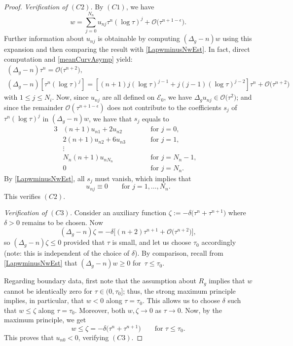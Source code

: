 \documentclass[10pt,a4paper]{amsart}
\numberwithin{equation}{section}
\def\Ecal{\mathcal{E}}
\def\Ocal{\mathcal{O}}
\begin{document}
\begin{proof}
\emph{Verification of $(C2)$.}
By $(C1)$, we have
\[
	w = \sum_{j = 0}^{N_n} u_{nj} \tau^n(\log\tau)^j + \Ocal\bigl(\tau^{n+1 - \epsilon}\bigr).
\]
Further information about $u_{nj}$ is obtainable by
computing $(\Delta_g - n)w$ using this expansion and then comparing the result with \eqref{LapwminusNwEst}. In fact, direct computation and \eqref{meanCurvAsymp}
yield:
\begin{gather*}
	(\Delta_g  - n)\tau^n  = \Ocal\bigl(\tau^{n+2}\bigr), \\
	(\Delta_g - n) [\tau^n(\log\tau)^j]
	 = \left[(n+1)j (\log\tau)^{j-1} + j(j-1)(\log\tau)^{j-2}\right]\tau^n+\Ocal\bigl(\tau^{n+2}\bigr)
\end{gather*}
with $1\le j\le N_i$.
Now, since $u_{nj}$ are all defined on $\Ecal_0$,
we have $\Delta_g u_{nj}\in \Ocal\big(\tau^2\big)$;
and since the remainder $\Ocal(\tau^{n+1-\epsilon})$ does not contribute to the coefficients $s_j$ of $\tau^n(\log\tau)^j$ in $(\Delta_g - n)w$, we have
that $s_j$ equals to
\begin{alignat*}{3}
		&(n+1)  u_{n1} + 2 u_{n2}\qquad &&\mbox{for } j = 0,&\\
		&2(n+1) u_{n2} + 6 u_{n3} \qquad &&\mbox{for } j= 1,&\\
		&\vdots&&&\\
		&N_n (n+1) u_{nN_n} \qquad &&\mbox{for }j = N_n - 1,&\\
		&0 \qquad &&\mbox{for }j = N_n.&
	\end{alignat*}
By \eqref{LapwminusNwEst}, all $s_j$ must vanish, which implies that
\begin{equation*}
	u_{nj} \equiv 0 \qquad\mbox{for } j =1, \ldots, N_n.
\end{equation*}
This verifies $(C2)$.

\emph{Verification of $(C3)$.}
Consider an auxiliary function $\zeta := -\delta \big(\tau^n + \tau^{n+1}\big)$
where $\delta>0$ remains to be chosen.
Now
\[
	(\Delta_g - n) \zeta = - \delta\big[(n+2) \tau^{n+1} + \Ocal\big(\tau^{n+2}\big)\big],
\]
so $(\Delta_g - n)\zeta \le 0$ provided that $\tau$ is small, and let us choose
$\tau_0$ accordingly (note: this is
independent of the choice of $\delta$).
By comparison, recall from \eqref{LapwminusNwEst} that
$(\Delta_g - n) w\ge 0$ for~$\tau\le \tau_0$.

Regarding boundary data, first note that the assumption about $R_g$
implies that $w$ cannot be identically zero for $\tau\in (0,\tau_0]$; thus, the strong maximum principle
implies, in particular, that $w < 0$ along $\tau = \tau_0$. This allows us to choose
$\delta$ such that $w \le \zeta$ along $\tau = \tau_0$.
Moreover, both $w, \zeta\rightarrow 0$ as $\tau\rightarrow 0$. Now, by the maximum
principle, we get
\[
	w\le \zeta = -\delta\bigl(\tau^n + \tau^{n+1}\bigr) \qquad\mbox{for } \tau\le \tau_0.
\]
This proves that $u_{n0}<0$, verifying $(C3)$.
\end{proof}
\end{document}
